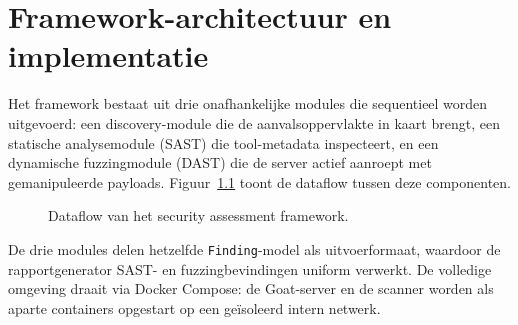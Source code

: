 
\chapter{Framework-architectuur en implementatie}%
\label{ch:implementatie}

Het framework bestaat uit drie onafhankelijke modules die sequentieel worden uitgevoerd: een discovery-module die de aanvalsoppervlakte in kaart brengt, een statische analysemodule (SAST) die tool-metadata inspecteert, en een dynamische fuzzingmodule (DAST) die de server actief aanroept met gemanipuleerde payloads. Figuur~\ref{fig:architectuur} toont de dataflow tussen deze componenten.

\begin{figure}[htbp]
    \centering
    \caption{Dataflow van het security assessment framework.}
    \label{fig:architectuur}
\end{figure}

De drie modules delen hetzelfde \texttt{Finding}-model als uitvoerformaat, waardoor de rapportgenerator SAST- en fuzzingbevindingen uniform verwerkt. De volledige omgeving draait via Docker Compose: de Goat-server en de scanner worden als aparte containers opgestart op een geïsoleerd intern netwerk.

